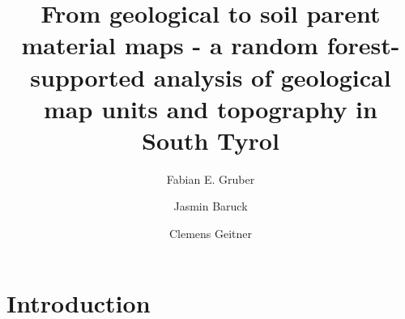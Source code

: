 \documentclass[preprint,12pt,authoryear]{elsarticle}
\begin{document}
\begin{frontmatter}

\title{From geological to soil parent material maps - a random forest-supported  analysis of geological map units and topography in South Tyrol}



\author[mymainadress]{Fabian E. Gruber}
\author[mymainadress]{Jasmin Baruck}
\author[mymainadress]{Clemens Geitner}



\address[mymainadress]{Institute of Geography, University of Innsbruck, Innrain 52f, 6020 Innsbruck, Austria}

\begin{abstract}

\end{abstract}

\begin{keyword}

\end{keyword}

\end{frontmatter}

\linenumbers

\section{Introduction}
\end{document}
